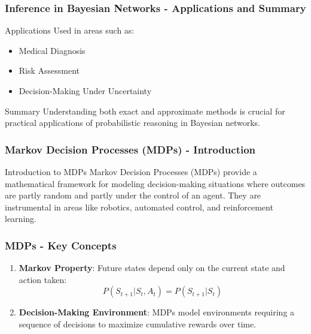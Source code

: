 \documentclass[aspectratio=169]{beamer}
\begin{document}
\begin{frame}[fragile]
    \frametitle{Inference in Bayesian Networks - Applications and Summary}
    \begin{block}{Applications}
        Used in areas such as:
        \begin{itemize}
            \item Medical Diagnosis
            \item Risk Assessment
            \item Decision-Making Under Uncertainty
        \end{itemize}
    \end{block}
    \begin{block}{Summary}
        Understanding both exact and approximate methods is crucial for practical applications of probabilistic reasoning in Bayesian networks.
    \end{block}
\end{frame}

\begin{frame}[fragile]
    \frametitle{Markov Decision Processes (MDPs) - Introduction}
    \begin{block}{Introduction to MDPs}
        Markov Decision Processes (MDPs) provide a mathematical framework for modeling decision-making situations where outcomes are partly random and partly under the control of an agent. They are instrumental in areas like robotics, automated control, and reinforcement learning.
    \end{block}
\end{frame}

\begin{frame}[fragile]
    \frametitle{MDPs - Key Concepts}
    \begin{enumerate}
        \item \textbf{Markov Property}: Future states depend only on the current state and action taken:
        \begin{equation}
            P(S_{t+1} | S_t, A_t) = P(S_{t+1} | S_t)
        \end{equation}
        \item \textbf{Decision-Making Environment}: MDPs model environments requiring a sequence of decisions to maximize cumulative rewards over time.
    \end{enumerate}
\end{frame}
\end{document}
